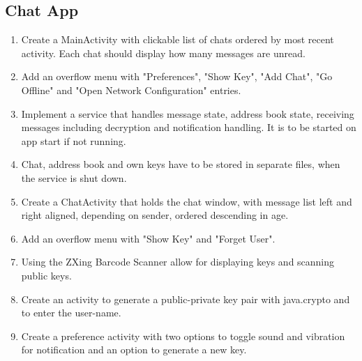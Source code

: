 \subsection{Chat App}
	\begin{enumerate}
		\item Create a MainActivity with clickable list of chats ordered by most recent activity. Each chat should display how many messages are unread.
		\item Add an overflow menu with "Preferences", "Show Key", "Add Chat", "Go Offline" and "Open Network Configuration" entries.
		\item Implement a service that handles message state, address book state, receiving messages including decryption and notification handling. It is to be started on app start if not running.
		\item Chat, address book and own keys have to be stored in separate files, when the service is shut down.
		\item Create a ChatActivity that holds the chat window, with message list left and right aligned, depending on sender, ordered descending in age.
		\item Add an overflow menu with "Show Key" and "Forget User".
		\item Using the ZXing Barcode Scanner allow for displaying keys and scanning public keys.
		\item Create an activity to generate a public-private key pair with java.crypto and to enter the user-name.
		\item Create a preference activity with two options to toggle sound and vibration for notification and an option to generate a new key.
	\end{enumerate}
			